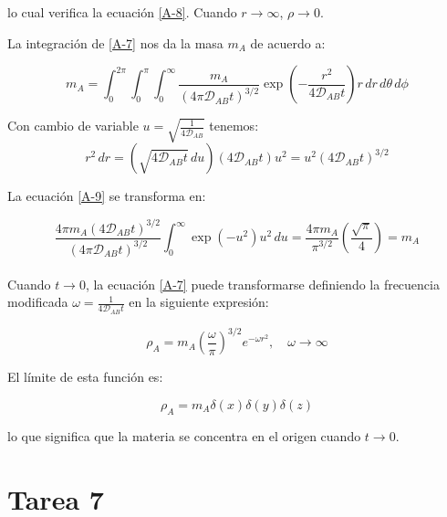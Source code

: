 lo cual verifica la ecuación \eqref{A-8}. Cuando \( r \to \infty \), \( \rho \to 0 \).

La integración de \eqref{A-7} nos da la masa \( m_A \) de acuerdo a:

    \[
        m_A = \int_0^{2\pi}\int_0^\pi\int_{0}^{\infty} \frac{m_A}{(4\pi \mathscr{D}_{AB} t)^{3/2}} \exp \left( -\frac{r^2}{4 \mathscr{D}_{AB} t} \right) r \, dr \, d\theta \, d\phi
    \tag{A-8}
    \label{A-9}
    \]

Con cambio de variable \(u=\sqrt{\frac{1}{4\mathscr{D}_{AB}}}\) tenemos:
    \[
     r^2 \, dr = (\sqrt{4 \mathscr{D}_{AB} t} \, du) \left( 4 \mathscr{D}_{AB} t  \right)u^2=u^2\left( 4 \mathscr{D}_{AB}t\right)^{3/2}
    \]

La ecuación \eqref{A-9} se transforma en:

    \[
        \frac{4\pi m_A (4 \mathscr{D}_{AB} t)^{3/2}}{(4 \pi \mathscr{D}_{AB} t)^{3/2}} \int_{0}^{\infty} \exp(-u^2) u^2 \, du = 
        \frac{4\pi m_A}{\pi^{3/2}} \left(\frac{\sqrt{\pi}}{4}\right) = m_A
    \]
    \\
Cuando \( t \to 0 \), la ecuación \eqref{A-7} puede transformarse definiendo la frecuencia modificada $\omega = \frac{1}{4 \mathscr{D}_{AB} t}$ en la siguiente expresión:

    \[
        \rho_A = m_A \left( \frac{\omega}{\pi} \right)^{3/2} e^{-\omega r^2}, \quad \omega \to \infty
    \]

El límite de esta función es:

    \[
        \rho_A = m_A \delta(x) \delta(y) \delta(z)
        \tag{A-10}
        \label{A-10}
    \]

lo que significa que la materia se concentra en el origen cuando \( t \to 0 \).
\newpage
\section{Tarea 7}

